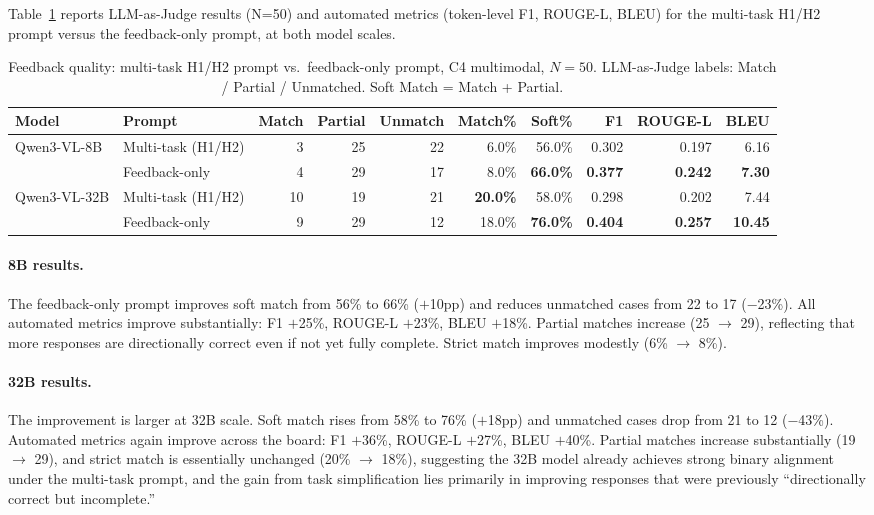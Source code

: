 \documentclass{article}
\begin{document}
Table~\ref{tab:modification} reports LLM-as-Judge results (N=50) and automated metrics (token-level F1,
ROUGE-L, BLEU) for the multi-task H1/H2 prompt versus the feedback-only prompt, at both model scales.

\begin{table}[H]
\centering
\small
\caption{Feedback quality: multi-task H1/H2 prompt vs.\ feedback-only prompt, C4 multimodal,
$N{=}50$. LLM-as-Judge labels: Match / Partial / Unmatched. Soft Match = Match + Partial.}
\label{tab:modification}
\begin{tabular}{@{}llrrrrrrrr@{}}
\toprule
Model & Prompt & Match & Partial & Unmatch & Match\% & Soft\% & F1 & ROUGE-L & BLEU \\
\midrule
\multirow{2}{*}{Qwen3-VL-8B}
 & Multi-task (H1/H2) & 3  & 25 & 22 & 6.0\%  & 56.0\% & 0.302 & 0.197 & 6.16 \\
 & Feedback-only      & 4  & 29 & 17 & 8.0\%  & \textbf{66.0\%} & \textbf{0.377} & \textbf{0.242} & \textbf{7.30} \\
\midrule
\multirow{2}{*}{Qwen3-VL-32B}
 & Multi-task (H1/H2) & 10 & 19 & 21 & \textbf{20.0\%} & 58.0\% & 0.298 & 0.202 & 7.44 \\
 & Feedback-only      & 9  & 29 & 12 & 18.0\% & \textbf{76.0\%} & \textbf{0.404} & \textbf{0.257} & \textbf{10.45} \\
\bottomrule
\end{tabular}
\end{table}

\paragraph{8B results.}
The feedback-only prompt improves soft match from 56\% to 66\% ($+$10pp) and reduces unmatched cases
from 22 to 17 ($-$23\%). All automated metrics improve substantially: F1 $+$25\%, ROUGE-L $+$23\%,
BLEU $+$18\%. Partial matches increase (25 $\rightarrow$ 29), reflecting that more responses are
directionally correct even if not yet fully complete. Strict match improves modestly (6\%
$\rightarrow$ 8\%).

\paragraph{32B results.}
The improvement is larger at 32B scale. Soft match rises from 58\% to 76\% ($+$18pp) and unmatched
cases drop from 21 to 12 ($-$43\%). Automated metrics again improve across the board: F1 $+$36\%,
ROUGE-L $+$27\%, BLEU $+$40\%. Partial matches increase substantially (19 $\rightarrow$ 29), and
strict match is essentially unchanged (20\% $\rightarrow$ 18\%), suggesting the 32B model already
achieves strong binary alignment under the multi-task prompt, and the gain from task simplification
lies primarily in improving responses that were previously ``directionally correct but incomplete.''
\end{document}
